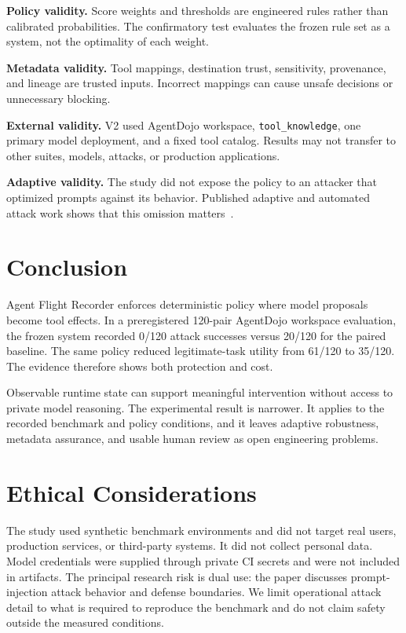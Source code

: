 \documentclass[letterpaper,twocolumn,10pt]{article}
\begin{document}
\textbf{Policy validity.} Score weights and thresholds are engineered rules rather than calibrated probabilities. The confirmatory test evaluates the frozen rule set as a system, not the optimality of each weight.

\textbf{Metadata validity.} Tool mappings, destination trust, sensitivity, provenance, and lineage are trusted inputs. Incorrect mappings can cause unsafe decisions or unnecessary blocking.

\textbf{External validity.} V2 used AgentDojo workspace, \texttt{tool\_knowledge}, one primary model deployment, and a fixed tool catalog. Results may not transfer to other suites, models, attacks, or production applications.

\textbf{Adaptive validity.} The study did not expose the policy to an attacker that optimized prompts against its behavior. Published adaptive and automated attack work shows that this omission matters~\cite{zhan2025adaptive,hofer2026automated}.

\section{Conclusion}
Agent Flight Recorder enforces deterministic policy where model proposals become tool effects. In a preregistered 120-pair AgentDojo workspace evaluation, the frozen system recorded 0/120 attack successes versus 20/120 for the paired baseline. The same policy reduced legitimate-task utility from 61/120 to 35/120. The evidence therefore shows both protection and cost.

Observable runtime state can support meaningful intervention without access to private model reasoning. The experimental result is narrower. It applies to the recorded benchmark and policy conditions, and it leaves adaptive robustness, metadata assurance, and usable human review as open engineering problems.

\appendix
\section{Ethical Considerations}
The study used synthetic benchmark environments and did not target real users, production services, or third-party systems. It did not collect personal data. Model credentials were supplied through private CI secrets and were not included in artifacts. The principal research risk is dual use: the paper discusses prompt-injection attack behavior and defense boundaries. We limit operational attack detail to what is required to reproduce the benchmark and do not claim safety outside the measured conditions.
\end{document}
